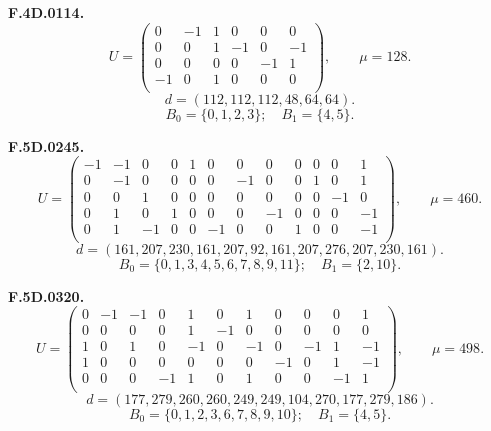 \par\medskip\noindent\begin{minipage}{\linewidth}\textbf{F.4D.0114.}
\begingroup\small\setlength{\arraycolsep}{3pt}
\[U=\begin{pmatrix}
0 & -1 & 1 & 0 & 0 & 0\\
0 & 0 & 1 & -1 & 0 & -1\\
0 & 0 & 0 & 0 & -1 & 1\\
-1 & 0 & 1 & 0 & 0 & 0\\
\end{pmatrix},\qquad \mu=128.\]
\[d=(112,112,112,48,64,64).\]
\[B_0=\{0,1,2,3\};\quad B_1=\{4,5\}.\]
\endgroup\end{minipage}\par
\par\medskip\noindent\begin{minipage}{\linewidth}\textbf{F.5D.0245.}
\begingroup\small\setlength{\arraycolsep}{3pt}
\[U=\begin{pmatrix}
-1 & -1 & 0 & 0 & 1 & 0 & 0 & 0 & 0 & 0 & 0 & 1\\
0 & -1 & 0 & 0 & 0 & 0 & -1 & 0 & 0 & 1 & 0 & 1\\
0 & 0 & 1 & 0 & 0 & 0 & 0 & 0 & 0 & 0 & -1 & 0\\
0 & 1 & 0 & 1 & 0 & 0 & 0 & -1 & 0 & 0 & 0 & -1\\
0 & 1 & -1 & 0 & 0 & -1 & 0 & 0 & 1 & 0 & 0 & -1\\
\end{pmatrix},\qquad \mu=460.\]
\[d=(161,207,230,161,207,92,161,207,276,207,230,161).\]
\[B_0=\{0,1,3,4,5,6,7,8,9,11\};\quad B_1=\{2,10\}.\]
\endgroup\end{minipage}\par
\par\medskip\noindent\begin{minipage}{\linewidth}\textbf{F.5D.0320.}
\begingroup\small\setlength{\arraycolsep}{3pt}
\[U=\begin{pmatrix}
0 & -1 & -1 & 0 & 1 & 0 & 1 & 0 & 0 & 0 & 1\\
0 & 0 & 0 & 0 & 1 & -1 & 0 & 0 & 0 & 0 & 0\\
1 & 0 & 1 & 0 & -1 & 0 & -1 & 0 & -1 & 1 & -1\\
1 & 0 & 0 & 0 & 0 & 0 & 0 & -1 & 0 & 1 & -1\\
0 & 0 & 0 & -1 & 1 & 0 & 1 & 0 & 0 & -1 & 1\\
\end{pmatrix},\qquad \mu=498.\]
\[d=(177,279,260,260,249,249,104,270,177,279,186).\]
\[B_0=\{0,1,2,3,6,7,8,9,10\};\quad B_1=\{4,5\}.\]
\endgroup\end{minipage}\par
